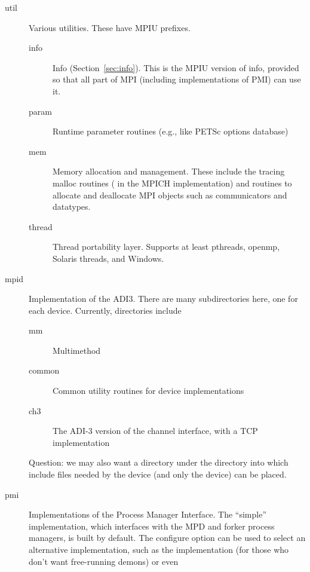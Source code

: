 \documentclass{article}
\begin{document}
\begin{description}
\begin{description}
  \item[util]Various utilities.  These have MPIU prefixes.
    \begin{description}
    \item[info]Info (Section~\ref{sec:info}).  This is the MPIU
    version of info, provided so 
    that all part of MPI (including implementations of PMI) can use it.
    \item[param]Runtime parameter routines (e.g., like PETSc options database)
    \item[mem]Memory allocation and management.  These include the tracing
      malloc routines ( in the MPICH implementation) and
    routines to allocate and deallocate MPI objects such as
    communicators and datatypes.
    \item[thread]Thread portability layer.  Supports at least pthreads,
      openmp, Solaris threads, and Windows.
    \end{description}
  \item[mpid]Implementation of the ADI3.  There are many
    subdirectories here, one for each device.  Currently, directories include
    \begin{description}
    \item[mm]Multimethod
    \item[common]Common utility routines for device implementations
    \item[ch3]The ADI-3 version of the channel interface, with a TCP
    implementation
    \end{description}
    Question: we may also want a  directory under the
     directory into which include files needed by the
    device (and only the device) can be placed.
  \item[pmi]Implementations of the Process Manager Interface.  The ``simple''
    implementation, which interfaces with the MPD and forker process managers,
    is built by default.   The configure option  can
    be used to select an alternative implementation, such as the 
    implementation (for those who don't want free-running demons) or even

\end{description}
\end{description}
\end{document}
